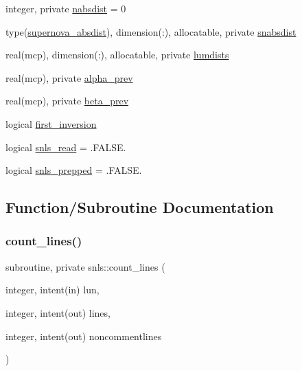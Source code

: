 \begin{DoxyCompactItemize}
integer, private \mbox{\hyperlink{namespacesnls_afec63a8af55bb2bb06acac7b19c0fc4c}{nabsdist}} = 0
\item 
type(\mbox{\hyperlink{structsnls_1_1supernova__absdist}{supernova\+\_\+absdist}}), dimension(\+:), allocatable, private \mbox{\hyperlink{namespacesnls_aa9cb8d9344c2bfe3a01327e48ae3aaf1}{snabsdist}}
\item 
real(mcp), dimension(\+:), allocatable, private \mbox{\hyperlink{namespacesnls_a5cc70993d1d6e6f59706685f982260ee}{lumdists}}
\item 
real(mcp), private \mbox{\hyperlink{namespacesnls_a0037badcbc89a4f561b14d59f08c7d48}{alpha\+\_\+prev}}
\item 
real(mcp), private \mbox{\hyperlink{namespacesnls_ad81e06277b2382bce10042fab9dcea40}{beta\+\_\+prev}}
\item 
logical \mbox{\hyperlink{namespacesnls_a40ca845281c24a135e23e1a160610163}{first\+\_\+inversion}}
\item 
logical \mbox{\hyperlink{namespacesnls_af9f3dc6698168f334d7e5066c0a1e9e5}{snls\+\_\+read}} = .F\+A\+L\+S\+E.
\item 
logical \mbox{\hyperlink{namespacesnls_ae512c41362a8967df80f9101ef7e5fd3}{snls\+\_\+prepped}} = .F\+A\+L\+S\+E.
\end{DoxyCompactItemize}


\subsection{Function/\+Subroutine Documentation}
\mbox{\label{namespacesnls_a956019aee61f8e8b602d1b4edb635909}} 
\subsubsection{\texorpdfstring{count\+\_\+lines()}{count\_lines()}}
{\footnotesize\ttfamily subroutine, private snls\+::count\+\_\+lines (\begin{DoxyParamCaption}\item[{integer, intent(in)}]{lun,  }\item[{integer, intent(out)}]{lines,  }\item[{integer, intent(out)}]{noncommentlines }\end{DoxyParamCaption})\hspace{0.3cm}{\ttfamily [private]}}



